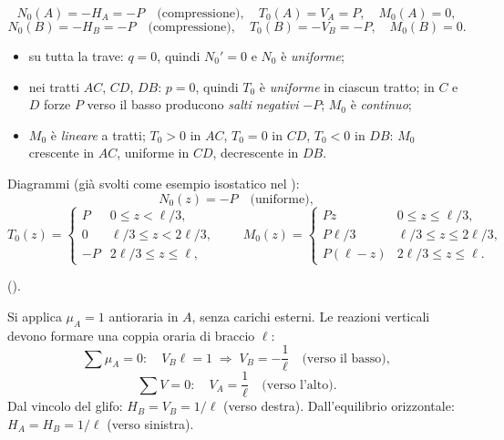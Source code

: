 \begin{esempio}
\begin{svolgimento}
		\[
		N_0(A) = -H_A = -P
		\quad\text{(compressione)},\quad
		T_0(A) = V_A = P,\quad
		M_0(A) = 0,
		\]
		\[
		N_0(B) = -H_B = -P
		\quad\text{(compressione)},\quad
		T_0(B) = -V_B = -P,\quad
		M_0(B) = 0.
		\]
		
		\begin{itemize}[nosep]
			\item su tutta la trave: $q = 0$, quindi
			$N_0' = 0$ e $N_0$ è \emph{uniforme};
			\item nei tratti $AC$, $CD$, $DB$: $p = 0$,
			quindi $T_0$ è \emph{uniforme} in
			ciascun tratto; in $C$ e $D$ forze
			$P$ verso il basso producono
			\emph{salti negativi} $-P$; $M_0$
			è \emph{continuo};
			\item $M_0$ è \emph{lineare} a tratti;
			$T_0 > 0$ in $AC$, $T_0 = 0$ in
			$CD$, $T_0 < 0$ in $DB$: $M_0$
			crescente in $AC$, uniforme in $CD$,
			decrescente in $DB$.
		\end{itemize}
		
		Diagrammi (già svolti come esempio isostatico
		nel ):
		\[
		N_0(z) = -P \quad\text{(uniforme)},
		\]
		\[
		T_0(z) = \begin{cases}
			P  & 0 \leq z < \ell/3, \\
			0  & \ell/3 \leq z < 2\ell/3, \\
			-P & 2\ell/3 \leq z \leq \ell,
		\end{cases}
		\qquad
		M_0(z) = \begin{cases}
			Pz            & 0 \leq z \leq \ell/3, \\
			P\ell/3       & \ell/3 \leq z \leq 2\ell/3, \\
			P(\ell - z)   & 2\ell/3 \leq z \leq \ell.
		\end{cases}
		\]
		
		().
		



		
		
		Si applica $\mu_A = 1$ antioraria in $A$,
		senza carichi esterni. Le reazioni verticali
		devono formare una coppia oraria di braccio
		$\ell$:
		\[
		\sum \mu_A = 0:\quad
		V_B\ell = 1
		\;\Rightarrow\; V_B = -\frac{1}{\ell}
		\quad\text{(verso il basso)},
		\]
		\[
		\sum V = 0:\quad
		V_A = \frac{1}{\ell}
		\quad\text{(verso l'alto)}.
		\]
		Dal vincolo del glifo: $H_B = V_B =
		1/\ell$ (verso destra).
		Dall'equilibrio orizzontale:
		$H_A = H_B = 1/\ell$ (verso sinistra).
		

\end{svolgimento}
\end{esempio}
